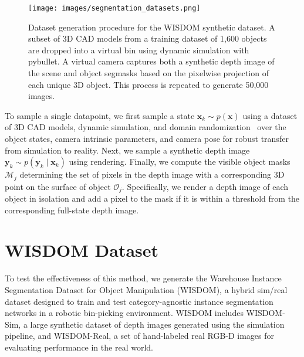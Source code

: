 \documentclass[letterpaper, 10 pt, conference]{ieeeconf}  \pdfoutput=1
\numberwithin{equation}{section}
\newcommand{\bx}{\mathbf{x}}
\newcommand{\by}{\mathbf{y}}
\newcommand{\mO}{\mathcal{O}}
\newcommand{\mM}{\mathcal{M}}
\begin{document}
\begin{figure*}[t!]
    \centering
    \texttt{[image: images/segmentation\_datasets.png]}
    \caption{Dataset generation procedure for the WISDOM synthetic dataset. A subset of 3D CAD models from a training dataset of 1,600 objects are dropped into a virtual bin using dynamic simulation with pybullet. A virtual camera captures both a synthetic depth image of the scene and object segmasks based on the pixelwise projection of each unique 3D object. This process is repeated to generate 50,000 images.}
  \label{fig:synthetic_dataset} 
\end{figure*}


To sample a single datapoint, we first sample a state $\bx_k \sim p(\bx)$ using a dataset of 3D CAD models, dynamic simulation, and domain randomization~\cite{tobin2017domain} over the object states, camera intrinsic parameters, and camera pose for robust transfer from simulation to reality.
Next, we sample a synthetic depth image $\by_k \sim p(\by_k \mid \bx_k)$ using rendering.
Finally, we compute the visible object masks $\mM_j$ determining the set of pixels in the depth image with a corresponding 3D point on the surface of object $\mO_j$.
Specifically, we render a depth image of each object in isolation and add a pixel to the mask if it is within a threshold from the corresponding full-state depth image.



%
 \section{WISDOM Dataset}

To test the effectiveness of this method, we generate the Warehouse Instance Segmentation Dataset for Object Manipulation (WISDOM), a hybrid sim/real dataset designed to train and test category-agnostic instance segmentation networks in a robotic bin-picking environment.
WISDOM includes WISDOM-Sim, a large synthetic dataset of depth images generated using the simulation pipeline, and WISDOM-Real, a set of hand-labeled real RGB-D images for evaluating performance in the real world.
\end{document}
